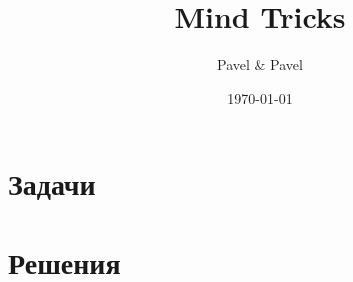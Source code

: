 \documentclass[12pt]{report}
\title{\bf Mind Tricks}
\author{Pavel \& Pavel}
\date{\today}
\begin{document}
\maketitle
\tableofcontents
\chapter{Задачи}



\chapter{Решения}
\end{document}
